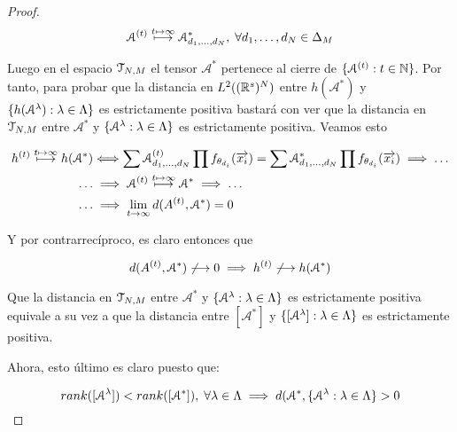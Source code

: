 \begin{proof}
    \begin{equation}
        \mathcal{A}^{(t)} \stackrel{t \mapsto \infty}{\longmapsto} \mathcal{A}^*_{d_1, \ldots, d_N},
        \; \forall d_1, \ldots, d_N \in \Delta_{M}
    \end{equation}

    Luego en el espacio $\mathcal{T}_{N, M}$ el tensor $\mathcal{A}^*$ pertenece al cierre de $\{ \mathcal{A}^{(t)}: t \in \mathbb{N} \}$. Por tanto, para probar que la distancia en $L^2((\mathbb{R}^s)^N)$ entre $h(\mathcal{A}^*)$ y $\{ h(\mathcal{A}^\lambda): \lambda \in \Lambda \}$ es estrictamente positiva bastará con ver que la distancia en $\mathcal{T}_{N, M}$ entre $\mathcal{A}^*$ y $\{ \mathcal{A}^\lambda: \lambda \in \Lambda \}$ es estrictamente positiva. Veamos esto

    \begin{equation}
    \begin{split}
        h^{(t)} \stackrel{t \mapsto \infty}{\longmapsto} h(\mathcal{A}^*) &\Longleftrightarrow \sum \mathcal{A}^{(t)}_{d_1, \ldots, d_N} \prod f_{\theta_{d_i}}(\overrightarrow{x_i}) = \sum \mathcal{A}^*_{d_1, \ldots, d_N} \prod f_{\theta_{d_i}}(\overrightarrow{x_i}) \implies \ldots \\
        \ldots &\implies \mathcal{A}^{(t)} \stackrel{t \mapsto \infty}{\longmapsto} \mathcal{A}^* \implies \ldots \\
        \ldots &\implies \lim_{t \to \infty} d(A^{(t)}, \mathcal{A}^*) = 0
    \end{split}
    \end{equation}

    Y por contrarrecíproco, es claro entonces que

    \begin{equation}
        d(A^{(t)}, \mathcal{A}^*) \not\longrightarrow 0 \implies h^{(t)} \not\longrightarrow h(\mathcal{A}^*)
    \end{equation}

    Que la distancia en $\mathcal{T}_{N, M}$ entre $\mathcal{A}^*$ y $\{ \mathcal{A}^\lambda: \lambda \in \Lambda \}$ es estrictamente positiva equivale a su vez a que la distancia entre $[\mathcal{A}^*]$ y $\{ [\mathcal{A}^\lambda]: \lambda \in \Lambda \}$ es estrictamente positiva.


    Ahora, esto último es claro puesto que:

    \begin{equation}
        rank([\mathcal{A}^\lambda]) < rank([\mathcal{A}^*]), \; \forall \lambda \in \Lambda \implies d(\mathcal{A}^*, \{ \mathcal{A}^\lambda: \lambda \in \Lambda \} > 0
    \end{equation}
\end{proof}

